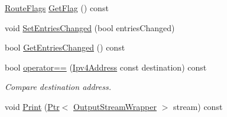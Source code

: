 \begin{DoxyCompactItemize}
\item 
\hyperlink{namespacens3_1_1dsdv_aa1c39555b993cc6f56f2c8c6c31e2c3b}{Route\+Flags} \hyperlink{classns3_1_1dsdv_1_1RoutingTableEntry_a7568252af054e3e321df890990867d7e}{Get\+Flag} () const 
\item 
void \hyperlink{classns3_1_1dsdv_1_1RoutingTableEntry_a4528de8b1d72fe42dfe6ad5a56cb4ed2}{Set\+Entries\+Changed} (bool entries\+Changed)
\item 
bool \hyperlink{classns3_1_1dsdv_1_1RoutingTableEntry_a57f72ab51fa866fef211bc9042041c44}{Get\+Entries\+Changed} () const 
\item 
bool \hyperlink{classns3_1_1dsdv_1_1RoutingTableEntry_a28e2c692a87aa80ca1f8063e628db5c5}{operator==} (\hyperlink{classns3_1_1Ipv4Address}{Ipv4\+Address} const destination) const 
\begin{DoxyCompactList}\small\item\em Compare destination address. \end{DoxyCompactList}\item 
void \hyperlink{classns3_1_1dsdv_1_1RoutingTableEntry_a9265d9edd111ba791855b81101f82eb5}{Print} (\hyperlink{classns3_1_1Ptr}{Ptr}$<$ \hyperlink{classns3_1_1OutputStreamWrapper}{Output\+Stream\+Wrapper} $>$ stream) const 
\end{DoxyCompactItemize}
